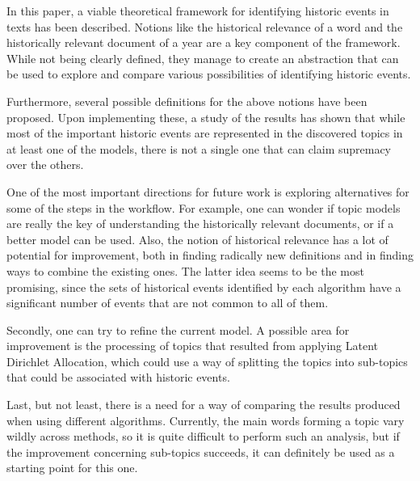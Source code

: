 
In this paper, a viable theoretical framework for identifying historic events in texts has been described. Notions like the historical relevance of a word and the historically relevant document of a year are a key component of the framework. While not being clearly defined, they manage to create an abstraction that can be used to explore and compare various possibilities of identifying historic events.

Furthermore, several possible definitions for the above notions have been proposed. Upon implementing these, a study of the results has shown that while most of the important historic events are represented in the discovered topics in at least one of the models, there is not a single one that can claim supremacy over the others.

One of the most important directions for future work is exploring alternatives for some of the steps in the workflow. For example, one can wonder if topic models are really the key of understanding the historically relevant documents, or if a better model can be used. Also, the notion of historical relevance has a lot of potential for improvement, both in finding radically new definitions and in finding ways to combine the existing ones. The latter idea seems to be the most promising, since the sets of historical events identified by each algorithm have a significant number of events that are not common to all of them.

Secondly, one can try to refine the current model. A possible area for improvement is the processing of topics that resulted from applying Latent Dirichlet Allocation, which could use a way of splitting the topics into sub-topics that could be associated with historic events.

Last, but not least, there is a need for a way of comparing the results produced when using different algorithms. Currently, the main words forming a topic vary wildly across methods, so it is quite difficult to perform such an analysis, but if the improvement concerning sub-topics succeeds, it can definitely be used as a starting point for this one.
